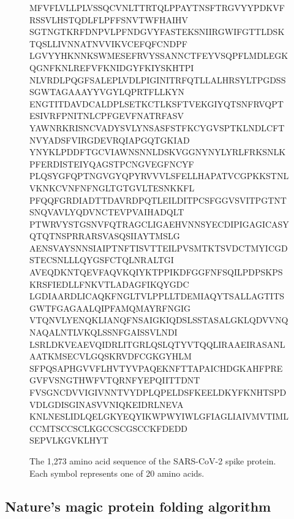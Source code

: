 \begin{figure}[h]
\begin{ttsequence}[0.93]MFVFLVLLPLVSSQCVNLTTRTQLPPAYTNSFTRGVYYPDKVFRSSVLHSTQDLFLPFFSNVTWFHAIHV\\
SGTNGTKRFDNPVLPFNDGVYFASTEKSNIIRGWIFGTTLDSKTQSLLIVNNATNVVIKVCEFQFCNDPF\\
LGVYYHKNNKSWMESEFRVYSSANNCTFEYVSQPFLMDLEGKQGNFKNLREFVFKNIDGYFKIYSKHTPI\\
NLVRDLPQGFSALEPLVDLPIGINITRFQTLLALHRSYLTPGDSSSGWTAGAAAYYVGYLQPRTFLLKYN\\
ENGTITDAVDCALDPLSETKCTLKSFTVEKGIYQTSNFRVQPTESIVRFPNITNLCPFGEVFNATRFASV\\
YAWNRKRISNCVADYSVLYNSASFSTFKCYGVSPTKLNDLCFTNVYADSFVIRGDEVRQIAPGQTGKIAD\\
YNYKLPDDFTGCVIAWNSNNLDSKVGGNYNYLYRLFRKSNLKPFERDISTEIYQAGSTPCNGVEGFNCYF\\
PLQSYGFQPTNGVGYQPYRVVVLSFELLHAPATVCGPKKSTNLVKNKCVNFNFNGLTGTGVLTESNKKFL\\
PFQQFGRDIADTTDAVRDPQTLEILDITPCSFGGVSVITPGTNTSNQVAVLYQDVNCTEVPVAIHADQLT\\
PTWRVYSTGSNVFQTRAGCLIGAEHVNNSYECDIPIGAGICASYQTQTNSPRRARSVASQSIIAYTMSLG\\
AENSVAYSNNSIAIPTNFTISVTTEILPVSMTKTSVDCTMYICGDSTECSNLLLQYGSFCTQLNRALTGI\\
AVEQDKNTQEVFAQVKQIYKTPPIKDFGGFNFSQILPDPSKPSKRSFIEDLLFNKVTLADAGFIKQYGDC\\
LGDIAARDLICAQKFNGLTVLPPLLTDEMIAQYTSALLAGTITSGWTFGAGAALQIPFAMQMAYRFNGIG\\
VTQNVLYENQKLIANQFNSAIGKIQDSLSSTASALGKLQDVVNQNAQALNTLVKQLSSNFGAISSVLNDI\\
LSRLDKVEAEVQIDRLITGRLQSLQTYVTQQLIRAAEIRASANLAATKMSECVLGQSKRVDFCGKGYHLM\\
SFPQSAPHGVVFLHVTYVPAQEKNFTTAPAICHDGKAHFPREGVFVSNGTHWFVTQRNFYEPQIITTDNT\\
FVSGNCDVVIGIVNNTVYDPLQPELDSFKEELDKYFKNHTSPDVDLGDISGINASVVNIQKEIDRLNEVA\\
KNLNESLIDLQELGKYEQYIKWPWYIWLGFIAGLIAIVMVTIMLCCMTSCCSCLKGCCSCGSCCKFDEDD\\
SEPVLKGVKLHYT\phantom{QCVNLTTRTQLPPAYTNSFTRGVYYPDKVFRSSVLHSTQDLFLPFFSNVTWFHAIHV}
\end{ttsequence}
\caption{The 1,273 amino acid sequence of the SARS-CoV-2 spike protein. Each symbol represents one of 20 amino acids.}
\label{fig:spike_protein_sequence}
\end{figure}

\subsection{Nature's magic protein folding algorithm}

